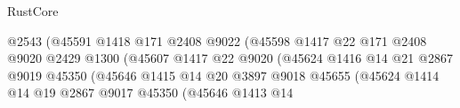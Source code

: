 \begin{lexlean}{RustCore}
\begin{coremodule}
                                                  @2543
                                                  (@45591
                                                    @1418
                                                    @171
                                                    @2408
                                                    @9022
                                                    (@45598
                                                      @1417
                                                      @22
                                                      @171
                                                      @2408
                                                      @9020
                                                      @2429
                                                      @1300
                                                      (@45607
                                                        @1417
                                                        @22
                                                        @9020
                                                        (@45624
                                                          @1416
                                                          @14
                                                          @21
                                                          @2867
                                                          @9019
                                                          @45350
                                                          (@45646
                                                            @1415
                                                            @14
                                                            @20
                                                            @3897
                                                            @9018
                                                            @45655
                                                            (@45624
                                                              @1414
                                                              @14
                                                              @19
                                                              @2867
                                                              @9017
                                                              @45350
                                                              (@45646
                                                                @1413
                                                                @14

\end{coremodule}
\end{lexlean}
